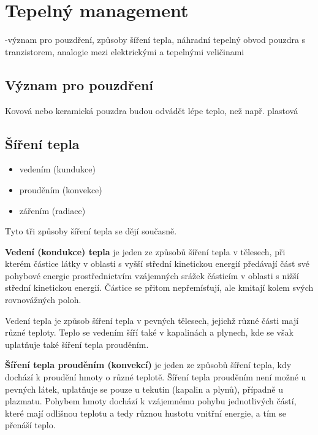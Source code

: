\section{Tepelný management}
-význam pro pouzdření, způsoby šíření tepla, náhradní tepelný obvod pouzdra s tranzistorem, analogie mezi elektrickými a tepelnými veličinami

\subsection{Význam pro pouzdření}
Kovová nebo keramická pouzdra budou odvádět lépe teplo, než např. plastová


\subsection{Šíření tepla}
\begin{itemize}
\item vedením (kundukce)
\item prouděním (konvekce)
\item zářením (radiace)
\end{itemize}
Tyto tři způsoby šíření tepla se dějí současně.

\textbf{Vedení (kondukce) tepla} je jeden ze způsobů šíření tepla v tělesech, při kterém částice látky v oblasti s vyšší střední kinetickou energií předávají část své pohybové energie prostřednictvím vzájemných srážek částicím v oblasti s nižší střední kinetickou energií. Částice se přitom nepřemísťují, ale kmitají kolem svých rovnovážných poloh.

Vedení tepla je způsob šíření tepla v pevných tělesech, jejichž různé části mají různé teploty. Teplo se vedením šíří také v kapalinách a plynech, kde se však uplatňuje také šíření tepla prouděním.

\textbf{Šíření tepla prouděním (konvekcí)} je jeden ze způsobů šíření tepla, kdy dochází k proudění hmoty o různé teplotě. Šíření tepla prouděním není možné u pevných látek, uplatňuje se pouze u tekutin (kapalin a plynů), případně u plazmatu. Pohybem hmoty dochází k vzájemnému pohybu jednotlivých částí, které mají odlišnou teplotu a tedy různou hustotu vnitřní energie, a tím se přenáší teplo.

